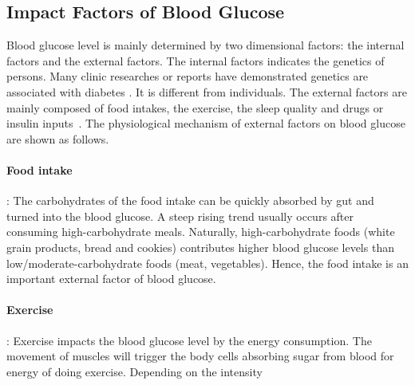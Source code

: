 \subsection{Impact Factors of Blood Glucose}
 Blood glucose level is mainly determined by two dimensional factors:  the internal factors and the external factors. The internal factors indicates the genetics of persons. Many clinic researches or reports have demonstrated genetics are associated with diabetes \cite{bib:simpson1978genetics,bib:diabetes_co_uk,bib:rotter1984genetics,bib:concannon2009genetics,bib:salopuro2004common}.
 It is different from individuals. The external factors are mainly composed of food intakes, the exercise, the sleep quality and drugs or insulin inputs~\cite{bib:duke2010intelligent}. The physiological mechanism of external factors on blood glucose are shown as follows.
 
\paragraph{Food intake}: The carbohydrates of the food intake can be quickly absorbed by gut and turned into the blood glucose. A steep rising trend usually occurs after consuming high-carbohydrate meals. Naturally, high-carbohydrate foods (\eg white grain products, bread and cookies) contributes higher blood glucose levels than low/moderate-carbohydrate foods (\eg meat, vegetables).
Hence, the food intake is an important external factor of blood glucose.
\paragraph{Exercise}: Exercise impacts the blood glucose level by the energy consumption. The movement of muscles will trigger the body cells absorbing sugar from blood for energy of doing exercise.  Depending on the intensity   